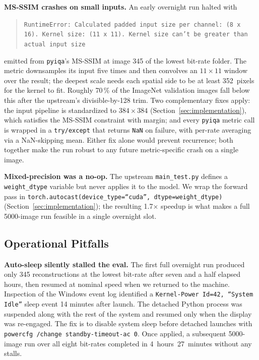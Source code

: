 \documentclass[conference]{IEEEtran}
\begin{document}
\textbf{MS-SSIM crashes on small inputs.} An early overnight run halted
with
\begin{quote}
\small\texttt{RuntimeError: Calculated padded input size per channel: (8 x 16). Kernel size: (11 x 11). Kernel size can't be greater than actual input size}
\end{quote}
emitted from \texttt{pyiqa}'s MS-SSIM at image 345 of the lowest bit-rate
folder. The metric downsamples its input five times and then convolves an
$11 \times 11$ window over the result; the deepest scale needs each
spatial side to be at least 352~pixels for the kernel to fit. Roughly
70\,\% of the ImageNet validation images fall below this after the
upstream's divisible-by-128 trim. Two complementary fixes apply: the input
pipeline is standardized to $384 \times 384$
(Section~\ref{sec:implementation}), which satisfies the MS-SSIM constraint
with margin; and every \texttt{pyiqa} metric call is wrapped in a
\texttt{try/except} that returns \texttt{NaN} on failure, with per-rate
averaging via a NaN-skipping mean. Either fix alone would prevent
recurrence; both together make the run robust to any future
metric-specific crash on a single image.

\textbf{Mixed-precision was a no-op.} The upstream \texttt{main\_test.py}
defines a \texttt{weight\_dtype} variable but never applies it to the
model. We wrap the forward pass in
\texttt{torch.autocast(device\_type=``cuda'', dtype=weight\_dtype)}
(Section~\ref{sec:implementation}); the resulting 1.7$\times$ speedup is
what makes a full 5000-image run feasible in a single overnight slot.

\subsection{Operational Pitfalls}

\textbf{Auto-sleep silently stalled the eval.} The first full overnight
run produced only 345 reconstructions at the lowest bit-rate after seven
and a half elapsed hours, then resumed at nominal speed when we returned
to the machine. Inspection of the Windows event log identified a
\texttt{Kernel-Power Id=42, ``System Idle''} sleep event 14 minutes after
launch. The detached Python process was suspended along with the rest of
the system and resumed only when the display was re-engaged. The fix is
to disable system sleep before detached launches with
\texttt{powercfg /change standby-timeout-ac 0}. Once applied, a subsequent
5000-image run over all eight bit-rates completed in 4~hours~27~minutes
without any stalls.
\end{document}

